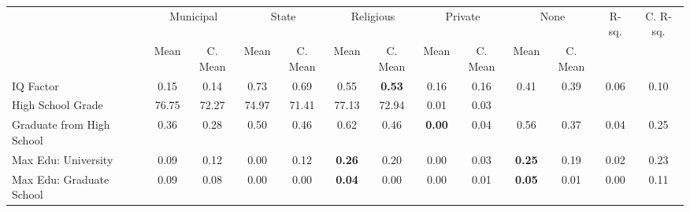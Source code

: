 \begin{tabular}{l c c c c c c c c c c c c}
\toprule
& \multicolumn{2}{c}{Municipal} & \multicolumn{2}{c}{State} & \multicolumn{2}{c}{Religious} & \multicolumn{2}{c}{Private} & \multicolumn{2}{c}{None} & R-sq. & C. R-sq. \\
& \scriptsize Mean & \scriptsize C. Mean & \scriptsize Mean & \scriptsize C. Mean & \scriptsize Mean & \scriptsize C. Mean & \scriptsize Mean & \scriptsize C. Mean & \scriptsize Mean & \scriptsize C. Mean & & \\
\midrule
IQ Factor &      0.15 & 0.14 &      0.73 & 0.69 &      0.55 & \textbf{     0.53} &      0.16 & 0.16 &      0.41 & 0.39 &      0.06 &      0.10 \\
High School Grade &     76.75 & 72.27 &     74.97 & 71.41 &     77.13 & 72.94 &      0.01 &      0.03 \\
Graduate from High School &      0.36 & 0.28 &      0.50 & 0.46 &      0.62 & 0.46 & \textbf{     0.00} & 0.04 &      0.56 & 0.37 &      0.04 &      0.25 \\
Max Edu: University &      0.09 & 0.12 &      0.00 & 0.12 & \textbf{     0.26} & 0.20 &      0.00 & 0.03 & \textbf{     0.25} & 0.19 &      0.02 &      0.23 \\
Max Edu: Graduate School &      0.09 & 0.08 &      0.00 & 0.00 & \textbf{     0.04} & 0.00 &      0.00 & 0.01 & \textbf{     0.05} & 0.01 &      0.00 &      0.11 \\
\bottomrule
\end{tabular}
